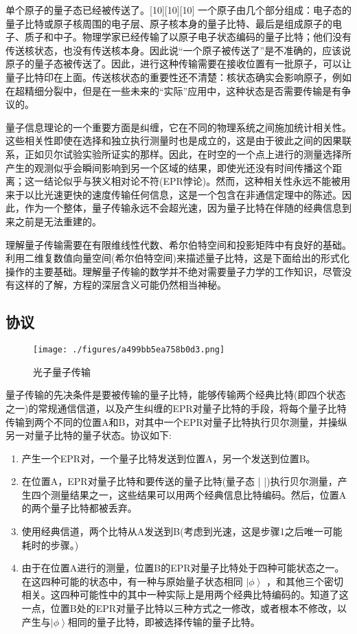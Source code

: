 单个原子的量子态已经被传送了。[10][10][10] 一个原子由几个部分组成：电子态的量子比特或原子核周围的电子层、原子核本身的量子比特、最后是组成原子的电子、质子和中子。物理学家已经传输了以原子电子状态编码的量子比特；他们没有传送核状态，也没有传送核本身。因此说“一个原子被传送了”是不准确的，应该说原子的量子态被传送了。因此，进行这种传输需要在接收位置有一批原子，可以让量子比特印在上面。传送核状态的重要性还不清楚：核状态确实会影响原子，例如在超精细分裂中，但是在一些未来的“实际”应用中，这种状态是否需要传输是有争议的。



量子信息理论的一个重要方面是纠缠，它在不同的物理系统之间施加统计相关性。这些相关性即使在选择和独立执行测量时也是成立的，这是由于彼此之间的因果联系，正如贝尔试验实验所证实的那样。因此，在时空的一个点上进行的测量选择所产生的观测似乎会瞬间影响到另一个区域的结果，即使光还没有时间传播这个距离；这一结论似乎与狭义相对论不符(EPR悖论)。然而，这种相关性永远不能被用来于以比光速更快的速度传输任何信息，这是一个包含在非通信定理中的陈述。因此，作为一个整体，量子传输永远不会超光速，因为量子比特在伴随的经典信息到来之前是无法重建的。

理解量子传输需要在有限维线性代数、希尔伯特空间和投影矩阵中有良好的基础。利用二维复数值向量空间(希尔伯特空间)来描述量子比特，这是下面给出的形式化操作的主要基础。理解量子传输的数学并不绝对需要量子力学的工作知识，尽管没有这样的了解，方程的深层含义可能仍然相当神秘。

\subsection{协议}

\begin{figure}[ht]
\centering
\texttt{[image: ./figures/a499bb5ea758b0d3.png]}
\caption{光子量子传输} \label{fig_LZYXCT_3}
\end{figure}

量子传输的先决条件是要被传输的量子比特，能够传输两个经典比特(即四个状态之一)的常规通信信道，以及产生纠缠的EPR对量子比特的手段，将每个量子比特传输到两个不同的位置A和B，对其中一个EPR对量子比特执行贝尔测量，并操纵另一对量子比特的量子状态。协议如下:

\begin{enumerate}
\item 产生一个EPR对，一个量子比特发送到位置A，另一个发送到位置B。
\item 在位置A，EPR对量子比特和要传送的量子比特(量子态 {\displaystyle |\phi \rangle } {\displaystyle |\phi \rangle })执行贝尔测量，产生四个测量结果之一，这些结果可以用两个经典信息比特编码。然后，位置A的两个量子比特都被丢弃。
\item 使用经典信道，两个比特从A发送到B(考虑到光速，这是步骤1之后唯一可能耗时的步骤。)
\item 由于在位置A进行的测量，位置B的EPR对量子比特处于四种可能状态之一。在这四种可能的状态中，有一种与原始量子状态相同 $\left| \phi \right\rangle$ ，和其他三个密切相关。这四种可能性中的其中一种实际上是用两个经典比特编码的。知道了这一点，位置B处的EPR对量子比特以三种方式之一修改，或者根本不修改，以产生与$\left| \phi \right\rangle$相同的量子比特，即被选择传输的量子比特。
\end{enumerate}

